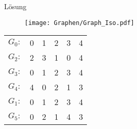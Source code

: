 \begin{frame}{Lösung}
	\begin{figure}[H]
		\centering
		\texttt{[image: Graphen/Graph\_Iso.pdf]}
	\end{figure}
	\begin{table}[H]
		\centering
		\begin{tabular}{c|c|c|c|c|c}
			$G_0: $ & 0 & 1 & 2 & 3 & 4 \\
			$G_2: $ & 2 & 3 & 1 & 0 & 4 \\[1em]
			$G_3: $ & 0 & 1 & 2 & 3 & 4 \\
			$G_4: $ & 4 & 0 & 2 & 1 & 3 \\[1em]
			$G_1: $ & 0 & 1 & 2 & 3 & 4 \\
			$G_5: $ & 0 & 2 & 1 & 4 & 3 \\
		\end{tabular}
	\end{table}
\end{frame}




